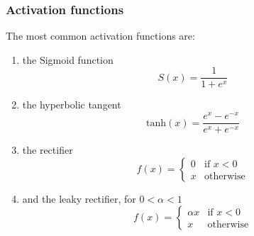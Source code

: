 \documentclass[12pt,a4paper,twoside,openright]{report}
\begin{document}
\subsubsection{Activation functions}
The most common activation functions are:
\begin{enumerate}
\item the Sigmoid function
\begin{equation}
S(x) = \frac{1}{1 + e^x} 
\end{equation}
\item the hyperbolic tangent
\begin{equation}
	\textrm{tanh}(x)=\frac{e^x - e^{-x}}{e^x + e^{-x}}
\end{equation}
\item the rectifier
\begin{equation}
\label{eq:linear_rectifier}
	f(x) = 
\begin{cases}
	0 & \text{if } x < 0\\
	x & \text{otherwise}
\end{cases}
\end{equation}
\item and the leaky rectifier, for $0 < \alpha < 1$
\begin{equation}
f(x) = 
\begin{cases}
	\alpha x & \text{if } x < 0\\
	x & \text{otherwise}
\end{cases}
\end{equation}
\end{enumerate}
\end{document}
